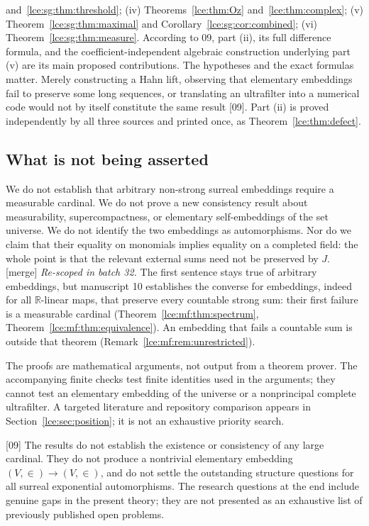 \documentclass[11pt,letterpaper]{article}
\numberwithin{equation}{section}
\theoremstyle{definition}
\theoremstyle{remark}
\newcommand{\R}{\mathbb R}
\newcommand{\thref}[1]{Theorem~\ref{#1}}
\newcommand{\src}[1]{\textup{\textsf{\small[#1]}}}%
\newcommand{\mergetag}{\textup{\textsf{\small[merge]}}}%
\begin{document}
and~\ref{lce:sg:thm:threshold}; (iv) Theorems~\ref{lce:thm:Oz}
and~\ref{lce:thm:complex}; (v) \thref{lce:sg:thm:maximal} and
Corollary~\ref{lce:sg:cor:combined}; (vi) \thref{lce:sg:thm:measure}.
According to 09, part (ii), its full difference formula, and the
coefficient-independent algebraic construction underlying part (v) are its
main proposed contributions. The hypotheses and the exact formulas matter.
Merely constructing a Hahn lift, observing that elementary embeddings fail
to preserve some long sequences, or translating an ultrafilter into a
numerical code would not by itself constitute the same result \src{09}.
Part (ii) is proved independently by all three sources and printed once, as
\thref{lce:thm:defect}.

\subsection{What is not being asserted}\label{lce:sub:nonasserted}
We do not establish that arbitrary non-strong surreal embeddings require a
measurable cardinal. We do not prove a new consistency result about
measurability, supercompactness, or elementary self-embeddings of the set
universe. We do not identify the two embeddings as automorphisms. Nor do we
claim that their equality on monomials implies equality on a completed
field: the whole point is that the relevant external sums need not be
preserved by $J$.
\mergetag{} \emph{Re-scoped in batch 32.} The first sentence stays true of
arbitrary embeddings, but manuscript 10 establishes the converse for
embeddings, indeed for all $\R$-linear maps, that preserve every countable
strong sum: their first failure is a measurable cardinal
(\thref{lce:mf:thm:spectrum}, \thref{lce:mf:thm:equivalence}). An embedding
that fails a countable sum is outside that theorem
(Remark~\ref{lce:mf:rem:unrestricted}).

The proofs are mathematical arguments, not output from a theorem prover.
The accompanying finite checks test finite identities used in the arguments;
they cannot test an elementary embedding of the universe or a nonprincipal
complete ultrafilter. A targeted literature and repository comparison appears
in Section~\ref{lce:sec:position}; it is not an exhaustive priority search.

\src{09} The results do not establish the existence or consistency of any
large cardinal. They do not produce a nontrivial elementary embedding
$(V,\in)\to(V,\in)$, and do not settle the outstanding structure questions
for all surreal exponential automorphisms. The research questions at the end
include genuine gaps in the present theory; they are not presented as an
exhaustive list of previously published open problems.
\end{document}
